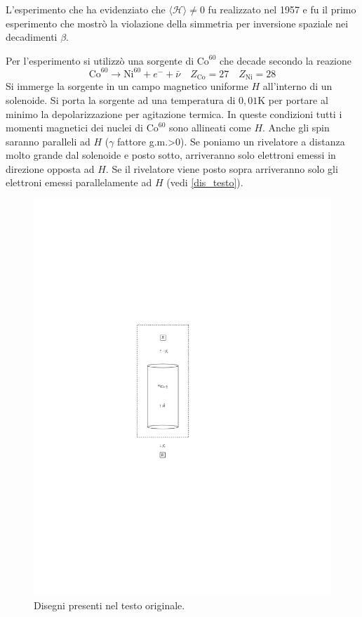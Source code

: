 L'esperimento che ha evidenziato che $\langle\mathcal{H}\rangle\neq 0$ fu 
realizzato nel 1957 e fu il primo esperimento che mostrò la violazione della 
simmetria per
inversione spaziale  nei decadimenti $\beta$.

Per l'esperimento si utilizzò una sorgente di $\text{Co}^{60}$ che decade 
secondo la reazione
\[
  \text{Co}^{60}\rightarrow \text{Ni}^{60}+e^-+\bar{\nu}\quad
  Z_\text{Co}=27\quad Z_\text{Ni}=28
\]
Si immerge la sorgente in un campo magnetico uniforme $H$ all'interno di un 
solenoide. Si porta la sorgente ad una temperatura di $0,01\si{\kelvin}$ per 
portare
al minimo la depolarizzazione per agitazione termica. In queste condizioni 
tutti i momenti magnetici dei nuclei di $\text{Co}^{60}$ sono allineati come 
$H$.
Anche gli spin saranno paralleli ad $H$ ($\gamma$ fattore g.m.>0).
Se poniamo un rivelatore a distanza molto grande dal solenoide e posto sotto, 
arriveranno solo elettroni emessi in direzione opposta ad $H$. Se il rivelatore 
viene posto sopra
arriveranno solo gli elettroni emessi parallelamente ad $H$ (vedi 
\autoref{dis_testo}).
\begin{figure}[!hbt]
\centering
\caption{Disegni presenti nel testo originale.}
\label{dis_testo}
\includegraphics{img/dis_pboh1}
\end{figure}
